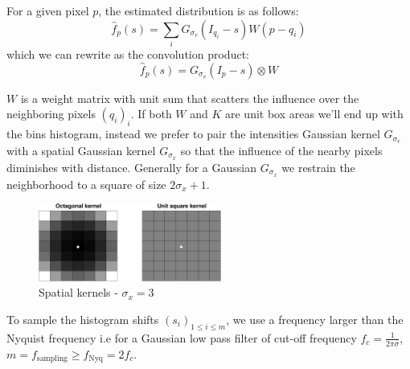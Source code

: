 \documentclass{acmsiggraph}
\newcommand{\Gv}{G_{\mathit{\sigma_v}}}
\newcommand{\Gx}{G_{\mathit{\sigma_x}}}
\begin{document}
For a given pixel $p$, the estimated distribution is as follows:
\[\hat f_p(s) = \sum_i \Gv(I_{q_i}-s)W(p-q_i)\]
which we can rewrite as the convolution product:
\begin{equation}
\hat f_p(s) = \Gv(I_p - s) \otimes W\label{hist}
\end{equation}

$W$ is a weight matrix with unit sum that scatters the influence over the neighboring pixels $(q_i)_i$. If both $W$ and $K$ are unit box areas we'll end up with the bins histogram, instead we prefer to pair the intensities Gaussian kernel $\Gv$ with a spatial Gaussian kernel $\Gx$ so that the influence of the nearby pixels diminishes with distance. Generally for a Gaussian $\Gx$ we restrain the neighborhood to a square of size $2\sigma_x+1$.
\begin{figure}[H]
\centering
\includegraphics[width=6cm]{kernels}
\caption{Spatial kernels - $\sigma_x = 3$ }
\end{figure}
To sample the histogram shifts $(s_i)_{1\leq i\leq m}$, we use a frequency larger than the Nyquist frequency i.e for a Gaussian low pass filter of cut-off frequency $f_c = \frac{1}{2\pi\sigma}$, $m = f_{\text{sampling}}\geq f_{\text{Nyq}}=2f_c$.
\end{document}
